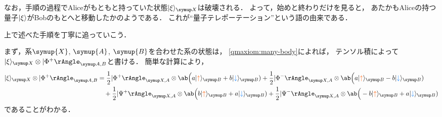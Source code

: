 \documentclass[
]{sotsu}
\newcommand{\bitone}{\mathcolor{fire}{\uparrow}}
\newcommand{\bittwo}{\mathcolor{water}{\downarrow}}
\begin{document}
\vspace{\baselineskip}



なお，手順の過程でAliceがもともと持っていた状態$\ket{\xi}<X>$は破壊される．
よって，始めと終わりだけを見ると，
あたかもAliceの持つ量子$\ket{\xi}$がBobのもとへと移動したかのようである．
これが``量子テレポーテーション''という語の由来である．



\vspace{\baselineskip}



\quad 
上で述べた手順を丁寧に追っていこう．

まず，系$\symup{X}$, $\symup{A}$, $\symup{B}$を合わせた系の状態は，
\cref{qmaxiom:many-body}によれば，
テンソル積によって$\ket{\xi}<X> \otimes \Ket{\Phi^+}<A,B>$と書ける．
簡単な計算により，
\begin{equation*}
    \begin{split}
        \ket{\xi}<X> \otimes \Ket{\Phi^+}<A,B>
        &= \frac{1}{2} \Ket{\Phi^+}<X,A> \otimes 
            \ab\Big( a \ket{\bitone}<B> + b \ket{\bittwo}<B> )
        + \frac{1}{2} \Ket{\Phi^-}<X,A> \otimes 
            \ab\Big( a \ket{\bitone}<B> - b \ket{\bittwo}<B> )
            \\
        &\quad + \frac{1}{2} \Ket{\Psi^+}<X,A> \otimes 
            \ab\Big( b \ket{\bitone}<B> + a \ket{\bittwo}<B> )
        + \frac{1}{2} \Ket{\Psi^-}<X,A> \otimes 
            \ab\Big(-b \ket{\bitone}<B> + a \ket{\bittwo}<B> )
    \end{split}
\end{equation*}
であることがわかる．
\end{document}
